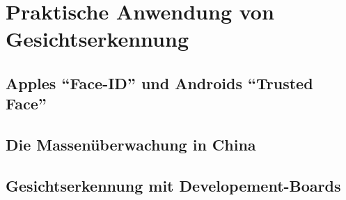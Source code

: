 \section{Praktische Anwendung von Gesichtserkennung}
\label{sec:Praltische_Anwendung_Kuenslicher_Intelligenz}

    \subsection{Apples \enquote{Face-ID} und Androids \enquote{Trusted Face}}
    \label{subsec:FaceID_TrustedFace}

    \subsection{Die Massenüberwachung in China}

    \subsection{Gesichtserkennung mit Developement-Boards}